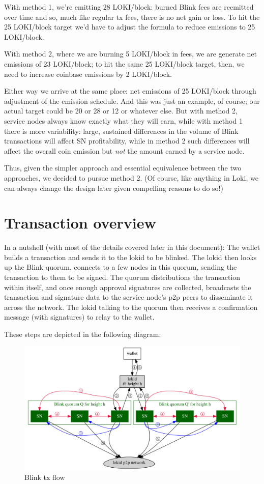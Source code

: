 With method 1, we're emitting 28 LOKI/block: burned Blink fees are
reemitted over time and so, much like regular tx fees, there is no net
gain or loss. To hit the 25 LOKI/block target we'd have to adjust the
formula to reduce emissions to 25 LOKI/block.

With method 2, where we are burning 5 LOKI/block in fees, we are
generate net emissions of 23 LOKI/block; to hit the same 25 LOKI/block
target, then, we need to increase coinbase emissions by 2 LOKI/block.

Either way we arrive at the same place: net emissions of 25 LOKI/block
through adjustment of the emission schedule. And this was just an
example, of course; our actual target could be 20 or 28 or 12 or
whatever else. But with method 2, service nodes always know exactly what
they will earn, while with method 1 there is more variability: large,
sustained differences in the volume of Blink transactions will affect SN
profitability, while in method 2 such differences will affect the
overall coin emission but \emph{not} the amount earned by a service
node.

Thus, given the simpler approach and essential equivalence between the
two approaches, we decided to pursue method 2. (Of course, like anything
in Loki, we can always change the design later given compelling reasons
to do so!)

\hypertarget{transaction-overview}{%
\section{Transaction overview}\label{transaction-overview}}

In a nutshell (with most of the details covered later in this document):
The wallet builds a transaction and sends it to the lokid to be blinked.
The lokid then looks up the Blink quorum, connects to a few nodes in
this quorum, sending the transaction to them to be signed. The quorum
distributions the transaction within itself, and once enough approval
signatures are collected, broadcasts the transaction and signature data
to the service node's p2p peers to disseminate it across the network.
The lokid talking to the quorum then receives a confirmation message
(with signatures) to relay to the wallet.

These steps are depicted in the following diagram:

\begin{figure}
\centering
\includegraphics{blink.svg}
\caption{Blink tx flow}
\end{figure}

